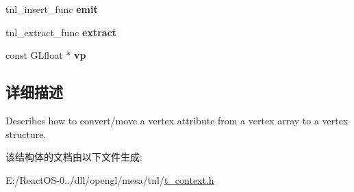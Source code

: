 \begin{DoxyCompactItemize}
\item 
\mbox{\label{structtnl__clipspace__attr_ad72e26ad74a4f8be9cdf7cc04026eeff}} 
tnl\+\_\+insert\+\_\+func {\bfseries emit}
\item 
\mbox{\label{structtnl__clipspace__attr_ad32498514cb02e0bf2fff5b67afd8126}} 
tnl\+\_\+extract\+\_\+func {\bfseries extract}
\item 
\mbox{\label{structtnl__clipspace__attr_a6f56c4e7d0bcf568d9bcf32941ef57f3}} 
const G\+Lfloat $\ast$ {\bfseries vp}
\end{DoxyCompactItemize}


\subsection{详细描述}
Describes how to convert/move a vertex attribute from a vertex array to a vertex structure. 

该结构体的文档由以下文件生成\+:\begin{DoxyCompactItemize}
\item 
E\+:/\+React\+O\+S-\/0../dll/opengl/mesa/tnl/\hyperlink{t__context_8h}{t\+\_\+context.\+h}\end{DoxyCompactItemize}

